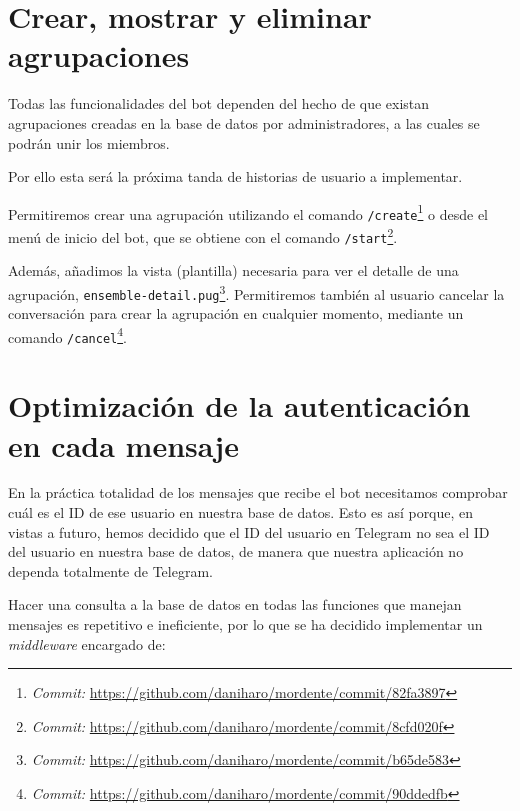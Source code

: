 \section{Crear, mostrar y eliminar agrupaciones}
Todas las funcionalidades del bot dependen del hecho de que existan agrupaciones creadas en la base de datos por administradores, a las cuales se podrán unir los miembros.

Por ello esta será la próxima tanda de historias de usuario a implementar.

Permitiremos crear una agrupación utilizando el comando \texttt{/create}\footnote{\textit{Commit:} \url{https://github.com/daniharo/mordente/commit/82fa3897}} o desde el menú de inicio del bot, que se obtiene con el comando \texttt{/start}\footnote{\textit{Commit:} \url{https://github.com/daniharo/mordente/commit/8cfd020f}}.

Además, añadimos la vista (plantilla) necesaria para ver el detalle de una agrupación, \texttt{ensemble-detail.pug}\footnote{\textit{Commit:} \url{https://github.com/daniharo/mordente/commit/b65de583}}. Permitiremos también al usuario cancelar la conversación para crear la agrupación en cualquier momento, mediante un comando \texttt{/cancel}\footnote{\textit{Commit:} \url{https://github.com/daniharo/mordente/commit/90ddedfb}}.


\section{Optimización de la autenticación en cada mensaje}\label{section:useAccount}

En la práctica totalidad de los mensajes que recibe el bot necesitamos comprobar cuál es el ID de ese usuario en nuestra base de datos. Esto es así porque, en vistas a futuro, hemos decidido que el ID del usuario en Telegram no sea el ID del usuario en nuestra base de datos, de manera que nuestra aplicación no dependa totalmente de Telegram.

Hacer una consulta a la base de datos en todas las funciones que manejan mensajes es repetitivo e ineficiente, por lo que se ha decidido implementar un \textit{middleware} encargado de:


